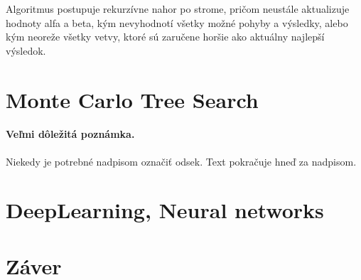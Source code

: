 \documentclass[10pt,twoside,slovak,a4paper]{article}
\begin{document}
Algoritmus postupuje rekurzívne nahor po strome, pričom neustále aktualizuje hodnoty alfa a beta, kým nevyhodnotí všetky možné pohyby a výsledky, alebo kým neoreže všetky vetvy, ktoré sú zaručene horšie ako aktuálny najlepší výsledok.


\section{Monte Carlo Tree Search} \label{MonteCarlo}

\paragraph{Veľmi dôležitá poznámka.}
Niekedy je potrebné nadpisom označiť odsek. Text pokračuje hneď za nadpisom.



\section{DeepLearning, Neural networks} \label{DeepNeural}







\section{Záver} \label{zaver} %






\end{document}
